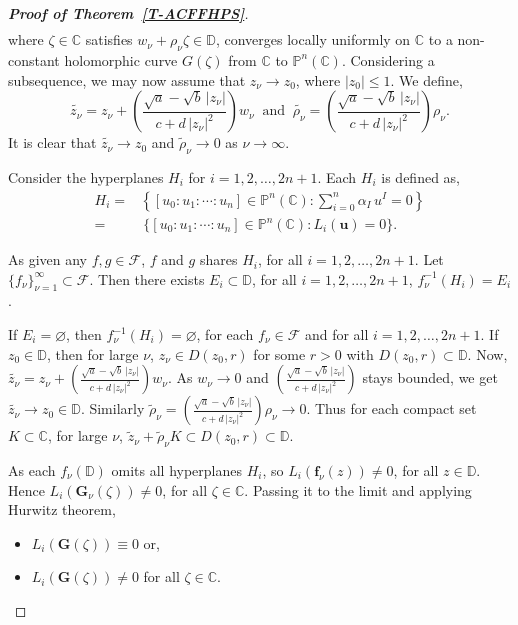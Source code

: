\documentclass[11pt, reqno]{amsart}
\theoremstyle{definition}
\theoremstyle{remark}
\numberwithin{equation}{section}
\begin{document}
\begin{proof}[{\bf Proof of Theorem~\ref{T-ACFFHPS}}]
\begin{align*}
\end{align*}
where $\zeta\in\mathbb C$ satisfies $w_{\nu}+\rho_{\nu}\zeta\in\mathbb D$, converges locally 
uniformly on $\mathbb C$ to a non-constant holomorphic curve $G(\zeta)$ from $\mathbb C$ to $\mathbb P^n(\mathbb C)$. 
Considering a subsequence, we may now assume that $z_{\nu}\to z_0$, where $|z_0|\leq 1$. We define,
$$\widetilde{z_{\nu}}=z_{\nu}+\left(\frac{\sqrt{a}-\sqrt{b}\,|z_{\nu}|}{c+d\,|z_{\nu}|^2}\right)w_{\nu}\ \text{ and }\ \widetilde{\rho_{\nu}}=\left(\frac{\sqrt{a}-\sqrt{b}\,|z_{\nu}|}{c+d\,|z_{\nu}|^2}\right)\rho_{\nu}.$$ 
It is clear that $\widetilde{z_{\nu}}\to z_0$ and $\widetilde\rho_{\nu}\to 0$ as $\nu\to\infty$.\smallskip

Consider the hyperplanes $H_i$ for $i=1,2,\dots,2n+1$. Each $H_i$ is defined as,
\begin{align*}H_i=&\left\{[u_0:u_1:\cdots:u_n]\in\mathbb P^n(\mathbb C):\sum_{i=0}^n \alpha_I\,u^I=0\right\}\\ =&~\{[u_0:u_1:\cdots:u_n]\in\mathbb P^n(\mathbb C):L_i(\mathbf u)=0\}.\end{align*}

As given any $f,g\in \mathcal F$, $f$ and $g$ shares $H_i$, for all $i=1,2,\dots,2n+1$. Let 
$\{f_{\nu}\}_{\nu=1}^{\infty}\subset\mathcal F$. Then there exists $E_i\subset \mathbb D$, 
for all $i=1,2,\dots,2n+1$, $f_{\nu}^{-1}(H_i)=E_i$. \smallskip

If $E_i=\varnothing$, then $f_{\nu}^{-1}(H_i)=\varnothing$, for each $f_{\nu}\in\mathcal F$ and for all $i=1,2,\dots,2n+1$. If 
$z_0\in\mathbb D$, then for large $\nu$, $z_{\nu}\in D(z_0,r)$ for some $r>0$ with $D(z_0,r)\subset\mathbb D$. Now, 
$\widetilde{z_{\nu}}=z_{\nu}+\left(\frac{\sqrt{a}-\sqrt{b}\,|z_{\nu}|}{c+d\,|z_{\nu}|^2}\right)w_{\nu}$. As 
$w_{\nu}\to 0$ and $\left(\frac{\sqrt{a}-\sqrt{b}\,|z_{\nu}|}{c+d\,|z_{\nu}|^2}\right)$ stays bounded, we get 
$\widetilde{z_{\nu}}\to z_0\in\mathbb D$. Similarly $\widetilde \rho_{\nu}=\left(\frac{\sqrt{a}-\sqrt{b}\,|z_{\nu}|}{c+d\,|z_{\nu}|^2}\right)\rho_{\nu}\to 0$. 
Thus for each compact set $K\subset\mathbb C$, for large $\nu$, $\widetilde z_{\nu} +\widetilde \rho_{\nu} K\subset D(z_0,r)\subset \mathbb D$. \smallskip

As each $f_{\nu}(\mathbb D)$ omits all hyperplanes $H_i$, so $L_i(\mathbf{f}_{\nu}(z))\neq 0$, for all $z\in\mathbb D$. Hence
$L_i(\mathbf{G}_{\nu}(\zeta))\neq 0$, for all $\zeta\in\mathbb C$. Passing it to the limit and applying Hurwitz theorem,
\begin{itemize}
    \item $L_i(\mathbf{G}(\zeta))\equiv 0$ or,
    \item $L_i(\mathbf{G}(\zeta))\neq 0$ for all $\zeta\in\mathbb C$.
\end{itemize}



\end{proof}
\end{document}
